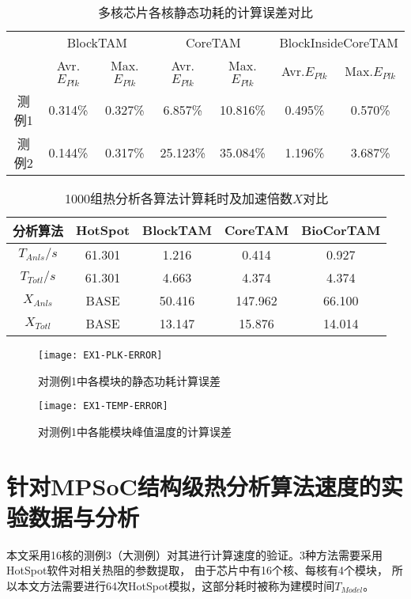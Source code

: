 \begin{table}
\centering
\caption{多核芯片各核静态功耗的计算误差对比}
\begin{tabular}{c c c c c c c}
\hline\hline
 & \multicolumn{2}{c}{BlockTAM} & \multicolumn{2}{c}{CoreTAM} & \multicolumn{2}{c}{BlockInsideCoreTAM} \\
 & Avr.$E_{Plk}$ & Max.$E_{Plk}$ & Avr.$E_{Plk}$ & Max.$E_{Plk}$ & Avr.$E_{Plk}$ & Max.$E_{Plk}$ \\
\hline
测例1 & 0.314\% & 0.327\% & 6.857\% & 10.816\% & 0.495\% & 0.570\% \\
\hline
测例2 & 0.144\% & 0.317\% & 25.123\% & 35.084\% & 1.196\% & 3.687\% \\
\hline
\end{tabular}
\label{tab:chap5:power-leakage-error}
\end{table}

\begin{table}
\centering
\caption{1000组热分析各算法计算耗时及加速倍数$X$对比}
\begin{tabular}{c c c c c}
\hline\hline
分析算法 & HotSpot & BlockTAM & CoreTAM & BioCorTAM \\ [0.5ex]
\hline
$T_{Anls}/s$ & 61.301 & 1.216 & 0.414 & 0.927 \\
\hline
$T_{Totl}/s$ & 61.301 & 4.663 & 4.374 & 4.374 \\
\hline
$X_{Anls}$ & BASE & 50.416 & 147.962 & 66.100 \\
\hline
$X_{Totl}$ & BASE & 13.147 & 15.876 & 14.014 \\
\hline
\end{tabular}
\label{tab:chap5:time-speedup}
\end{table}

\begin{figure}[H]
  \centering
  \texttt{[image: EX1-PLK-ERROR]}
  \caption{对测例1中各模块的静态功耗计算误差}
  \label{fig:ex1-plk-error}
\end{figure}
\begin{figure}[H]
  \centering
  \texttt{[image: EX1-TEMP-ERROR]}
  \caption{对测例1中各能模块峰值温度的计算误差}
  \label{fig:ex1-temp-error}
\end{figure}


\section{针对MPSoC结构级热分析算法速度的实验数据与分析}
\label{exp-speedup}
本文采用16核的测例3（大测例）对其进行计算速度的验证。3种方法需要采用HotSpot软件对相关热阻的参数提取， 由于芯片中有16个核、每核有4个模块， 所以本文方法需要进行64次HotSpot模拟，这部分耗时被称为建模时间$T_{Model}$。

